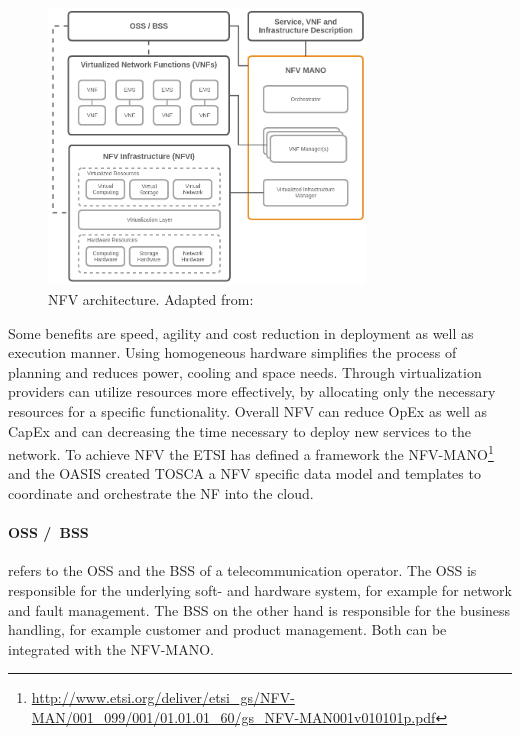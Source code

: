 \begin{figure}[H]
    \centering
    \includegraphics[width=0.75\textwidth]{resources/images/nfv_architecture.png}
    \caption[NFV architecture]{NFV architecture. Adapted from: \autocite{NFV:Architecture}}
    \label{fig:nfv_architecture}
\end{figure}

Some benefits are speed, agility and cost reduction in deployment as well as execution manner.\autocite[cf.]{Noble:2015}
Using homogeneous hardware simplifies the process of planning and reduces power, cooling and space needs.\autocite[cf.]{Noble:2015}
Through virtualization providers can utilize resources more effectively, by allocating only the necessary resources for a specific functionality.\autocite[cf.]{Noble:2015}
Overall \ac{NFV} can reduce \ac{OpEx} as well as \ac{CapEx} and can decreasing the time necessary to deploy new services to the network.\autocite[cf.]{Noble:2015}
To achieve \ac{NFV} the \ac{ETSI} has defined a framework the \ac{NFV-MANO}\footnote{\url{http://www.etsi.org/deliver/etsi_gs/NFV-MAN/001_099/001/01.01.01_60/gs_NFV-MAN001v010101p.pdf}} and the \ac{OASIS} created \ac{TOSCA} a \ac{NFV} specific data model and templates to coordinate and orchestrate the \ac{NF} into the cloud.

\paragraph{\acs{OSS} /\ \acs{BSS}} refers to the \ac{OSS} and the \ac{BSS} of a telecommunication operator.\autocite[cf.]{Kahn:2015}
The \ac{OSS} is responsible for the underlying soft- and hardware system, for example for network and fault management.
The \ac{BSS} on the other hand is responsible for the business handling, for example customer and product management.
Both can be integrated with the \ac{NFV-MANO}.\autocite[cf.]{Kahn:2015}

